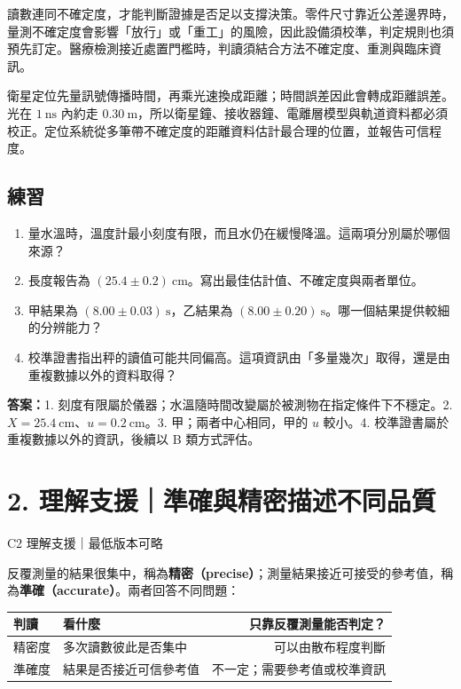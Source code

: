 \documentclass[11pt,a4paper]{article}
\newcounter{none}
\providecommand{\tightlist}{%
  \setlength{\itemsep}{0pt}\setlength{\parskip}{0pt}}
\begin{document}
讀數連同不確定度，才能判斷證據是否足以支撐決策。零件尺寸靠近公差邊界時，量測不確定度會影響「放行」或「重工」的風險，因此設備須校準，判定規則也須預先訂定。醫療檢測接近處置門檻時，判讀須結合方法不確定度、重測與臨床資訊。

衛星定位先量訊號傳播時間，再乘光速換成距離；時間誤差因此會轉成距離誤差。光在 \(1\ \mathrm{ns}\) 內約走 \(0.30\ \mathrm m\)，所以衛星鐘、接收器鐘、電離層模型與軌道資料都必須校正。定位系統從多筆帶不確定度的距離資料估計最合理的位置，並報告可信程度。

\begin{HandoutSelfCheck}

\subsection{練習}\label{ux7df4ux7fd2}

\begin{enumerate}
\def\labelenumi{\arabic{enumi}.}
\tightlist
\item
  量水溫時，溫度計最小刻度有限，而且水仍在緩慢降溫。這兩項分別屬於哪個來源？
\item
  長度報告為 \((25.4\pm0.2)\ \mathrm{cm}\)。寫出最佳估計值、不確定度與兩者單位。
\item
  甲結果為 \((8.00\pm0.03)\ \mathrm{s}\)，乙結果為 \((8.00\pm0.20)\ \mathrm{s}\)。哪一個結果提供較細的分辨能力？
\item
  校準證書指出秤的讀值可能共同偏高。這項資訊由「多量幾次」取得，還是由重複數據以外的資料取得？
\end{enumerate}

\textbf{答案：}1. 刻度有限屬於儀器；水溫隨時間改變屬於被測物在指定條件下不穩定。2. \(X=25.4\ \mathrm{cm}\)、\(u=0.2\ \mathrm{cm}\)。3. 甲；兩者中心相同，甲的 \(u\) 較小。4. 校準證書屬於重複數據以外的資訊，後續以 B 類方式評估。

\end{HandoutSelfCheck}

\section{2. 理解支援｜準確與精密描述不同品質}\label{ux7406ux89e3ux652fux63f4ux6e96ux78baux8207ux7cbeux5bc6ux63cfux8ff0ux4e0dux540cux54c1ux8cea}

{C2 理解支援｜最低版本可略}

反覆測量的結果很集中，稱為\textbf{精密（precise）}；測量結果接近可接受的參考值，稱為\textbf{準確（accurate）}。兩者回答不同問題：

{\def\LTcaptype{none} %
\begin{longtable}[]{@{}llr@{}}
\toprule\noalign{}
判讀 & 看什麼 & 只靠反覆測量能否判定？ \\
\midrule\noalign{}
\endhead
\bottomrule\noalign{}
\endlastfoot
精密度 & 多次讀數彼此是否集中 & 可以由散布程度判斷 \\
準確度 & 結果是否接近可信參考值 & 不一定；需要參考值或校準資訊 \\
\end{longtable}
}
\end{document}

